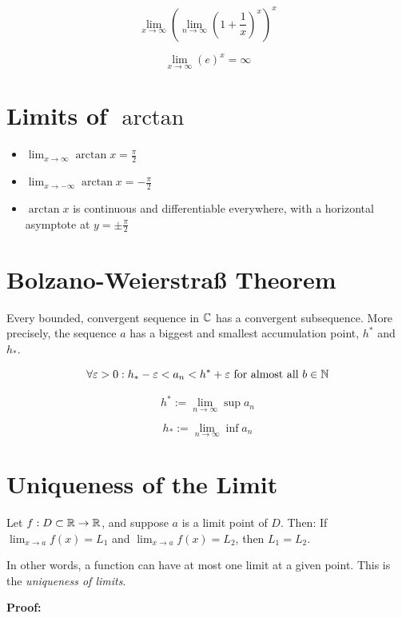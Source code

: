 \[
    \lim_{x \to \infty} \left(\lim_{n \to \infty} \left( 1 + \frac{1}{x}\right)^{x}\right)^x
\]


\[
    \lim_{x \to \infty} \left( e \right)^x = \infty
\]

\section{Limits of \texorpdfstring{\(\arctan\)}{arctan}}

\begin{itemize}

    \item \(\lim_{x \to \infty} \arctan x = \frac{\pi}{2}\)

    \item \(\lim_{x \to -\infty} \arctan x = -\frac{\pi}{2}\)

    \item \(\arctan x\) is continuous and differentiable everywhere, with a horizontal asymptote at 
    \(y = \pm \frac{\pi}{2}\)

\end{itemize}

\section{Bolzano-Weierstraß Theorem}

Every bounded, convergent sequence in \(\mathbb{C}\) has a convergent subsequence.
More precisely, the sequence \(a\) has a biggest and smallest accumulation point, \(h^*\) and \(h_*\).

\[
    \forall \varepsilon > 0 : h_* - \varepsilon < a_n < h^{*} + \varepsilon \text{ for almost all } 
    b \in \mathbb{N}
\]

\[
    h^* := \lim_{n \to \infty} \sup a_n
\]

\[
    h_* := \lim_{n \to \infty} \inf a_n
\]

\section{Uniqueness of the Limit}

Let \( f: D \subset \mathbb{R} \to \mathbb{R} \), and suppose \(a\) is a limit point of \( D \). Then:
If \( \lim_{x \to a} f(x) = L_1 \) and \( \lim_{x \to a} f(x) = L_2 \), then \( L_1 = L_2 \).

In other words, a function can have at most one limit at a given point. This is the \emph{uniqueness of limits}.

\textbf{Proof:}

